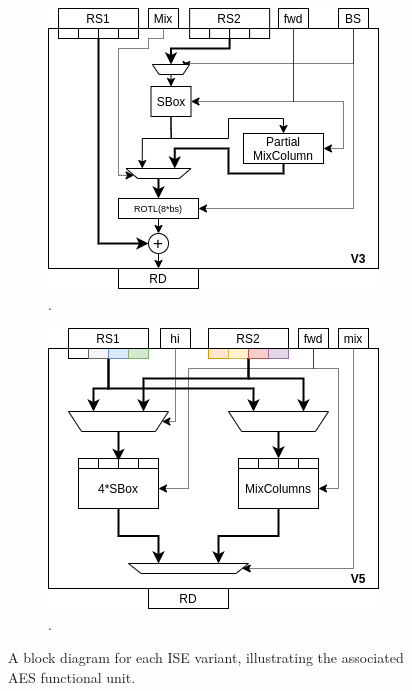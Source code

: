 \begin{figure}[t]
\begin{subfigure}[t]{0.40\textwidth}
    \centering
    \includegraphics[width=\textwidth]{diagrams/ise-datapath-v3.png}
    \caption{.}
    \label{fig:design:fu_block:v3}
\end{subfigure}
\begin{subfigure}[t]{0.40\textwidth}
    \centering
    \includegraphics[width=\textwidth]{diagrams/ise-datapath-v5.png}
    \caption{.}
    \label{fig:design:fu_block:v5}
\end{subfigure}
\label{fig:design:fu_block}
\caption{
A block diagram for each ISE variant, illustrating the associated AES functional unit.
}
\end{figure}

